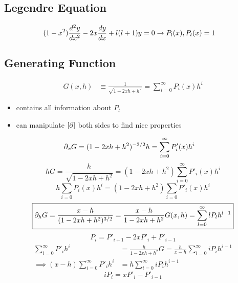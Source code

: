 \documentclass[Maths.tex]{subfiles}
\begin{document}
\chapter{}
\section{Legendre Equation}
\begin{align*}
    (1-x^2)\frac{d^2 y}{dx^2} &- 2x\frac{dy}{dx} + l(l+1)y = 0 \to P_l(x), P_l(x) = 1
\end{align*}
\section{Generating Function}
\begin{align*}
    G(x,h) &\equiv \frac{1}{\sqrt{1-2xh+h^2}} = \sum_{i=0}^\infty P_i(x)h^i
\end{align*}
\begin{itemize}
    \item contains all information about $P_l$
    \item can manipulate $[\partial]$ both sides to find nice properties
\end{itemize}
\begin{align*}
    \partial_xG &= (1-2xh+h^2)^{-3/2}h = \sum_{i=0}^\infty P'_i(x)h^i
\end{align*}
\begin{equation*}
    \boxed{hG = \frac{h}{\sqrt{1-2xh+h^2}} = (1-2xh+h^2)\sum_{i=0}^\infty P'_i(x)h^i}
\end{equation*}
\begin{equation*}
    \boxed{h\sum_{i=0} P_i(x)h^i = (1-2xh+h^2)\sum_{i=0}P'_i(x)h^i}
\end{equation*}
\begin{equation*}
    \boxed{\partial_hG = \frac{x-h}{(1-2xh+h^2)^{3/2}} = \frac{x-h}{1-2xh+h^2}G(x,h) = \sum_{l=0}^\infty lP_lh^{l-1}}
\end{equation*}
\begin{equation*}
    \boxed{P_i = P'_{i+1} - 2xP'_i + P'_{i-1}}
\end{equation*}
\begin{align*}
    \sum_{i=0}^\infty P'_ih^i &= \frac{h}{1-2xh+h^2}G = \frac{h}{x-h}\sum_{i=0}^\infty iP_ih^{i-1} \\
    \implies (x-h)\sum_{i=0}^\infty P'_ih^i &= h\sum_{i=0}^\infty iP_ih^{i-1}
\end{align*}
\begin{equation}
    \boxed{iP_i = xP'_i - P'_{i-1}}
\end{equation}
\end{document}
